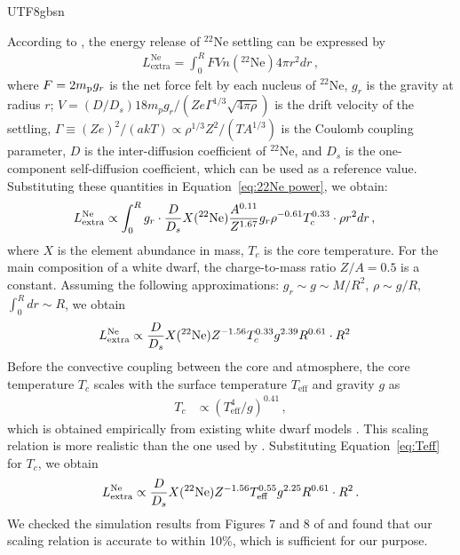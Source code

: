 \documentclass[twocolumn, times, trackchanges]{aastex63_bren}
\begin{document}
\begin{CJK*}{UTF8}{gbsn}
\begin{appendix}
According to \citet{Bildsten_2001}, the energy release of $^{22}$Ne settling can be expressed by
\begin{align}
\label{eq:22Ne power}
    L^\text{Ne}_\text{extra}=\int_0^R FVn(^{22}\text{Ne})4\pi r^2 dr\,,
\end{align}
where $F=2m_{\rm p} g_r$ is the net force felt by each nucleus of $^{22}$Ne, $g_r$ is the gravity at radius $r$; $V=(D/D_s)18m_p g_r/(Ze\Gamma^{1/3}\sqrt{4\pi \rho})$ is the drift velocity of the settling, $\Gamma\equiv (Ze)^{2}/(akT)\propto \rho^{1/3}Z^2/(TA^{1/3})$ is the Coulomb coupling parameter, $D$ is the inter-diffusion coefficient of $^{22}$Ne, and $D_s$ is the one-component self-diffusion coefficient, which can be used as a reference value. Substituting these quantities in Equation~\ref{eq:22Ne power}, we obtain:
\begin{align}
    L^\text{Ne}_\text{extra}&\propto \int_0^R g_r \cdot \frac{D}{D_s} X(^{22}{\rm Ne}) \frac{A^{0.11}}{Z^{1.67}} g_r\rho^{-0.61} T_c^{0.33} \cdot \rho r^2 dr\,,
\end{align}
where $X$ is the element abundance in mass, $T_c$ is the core temperature. For the main composition of a white dwarf, the charge-to-mass ratio $Z/A=0.5$ is a constant. Assuming the following approximations: $g_r \sim g \sim M/R^2$, $\rho \sim g/R$, $\int_0^R dr \sim R$, we obtain
\begin{align}
    L^\text{Ne}_\text{extra}
    &\propto \frac{D}{D_s} X(^{22}{\rm Ne}) Z^{-1.56} T_c^{0.33} g^{2.39} R^{0.61} \cdot R^2
\end{align}
Before the convective coupling between the core and atmosphere, the core temperature $T_c$ scales with the surface temperature $T_\text{eff}$ and gravity $g$ as
\begin{align}
\label{eq:Teff}
    T_c &\propto (T_\text{eff}^4/g)^{0.41}\,,
\end{align}
which is obtained empirically from existing white dwarf models \citep{Fontaine_2001}. This scaling relation is more realistic than the one used by \citet{Mestel_1952}. Substituting Equation~\ref{eq:Teff} for $T_c$, we obtain
\begin{align}
    L^\text{Ne}_\text{extra}
    \propto \frac{D}{D_s} X(^{22}{\rm Ne}) Z^{-1.56} T_\text{eff}^{0.55} g^{2.25} R^{0.61} \cdot R^2\,.
\end{align}
We checked the simulation results from Figures 7 and 8 of \citet{Garcia-Berro_2008} and found that our scaling relation is accurate to within 10\%, which is sufficient for our purpose.


\end{appendix}
\end{CJK*}
\end{document}

